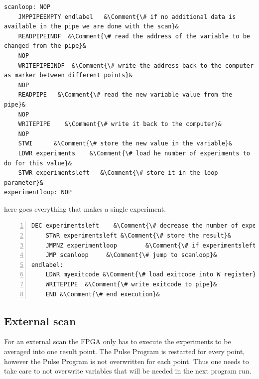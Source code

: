 \documentclass[11pt]{scrartcl}
\begin{document}
\begin{lstlisting}
scanloop: NOP
	JMPPIPEEMPTY endlabel   &\Comment{\# if no additional data is available in the pipe we are done with the scan}&
	READPIPEINDF  &\Comment{\# read the address of the variable to be changed from the pipe}&
	NOP
	WRITEPIPEINDF  &\Comment{\# write the address back to the computer as marker between different points}&
	NOP
	READPIPE   &\Comment{\# read the new variable value from the pipe}&
	NOP
	WRITEPIPE    &\Comment{\# write it back to the computer}&
	NOP
	STWI      &\Comment{\# store the new value in the variable}&
	LDWR experiments    &\Comment{\# load he number of experiments to do for this value}&
	STWR experimentsleft   &\Comment{\# store it in the loop parameter}&
experimentloop: NOP
\end{lstlisting}
 here goes everything that makes a single experiment.

\begin{lstlisting}[numbers=left, firstnumber=last]
	DEC experimentsleft    &\Comment{\# decrease the number of experiments left to do, result is in W}&
	STWR experimentsleft &\Comment{\# store the result}&
	JMPNZ experimentloop        &\Comment{\# if experimentsleft>0 jump to experimentloop}&
	JMP scanloop     &\Comment{\# jump to scanloop}&
endlabel:
	LDWR myexitcode &\Comment{\# load exitcode into W register}&
	WRITEPIPE  &\Comment{\# write exitcode to pipe}&
	END &\Comment{\# end execution}&
\end{lstlisting}

\subsection{External scan}
For an external scan the FPGA only has to execute the experiments to be averaged into one result point. The Pulse Program is restarted for every point, however the Pulse Program is not overwritten for each point. Thus one needs to take care to not overwrite variables that will be needed in the next program run.
\end{document}
